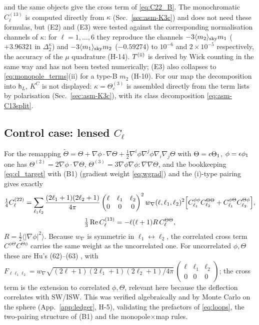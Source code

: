and the same objects give the cross term of \eqref{eq:C22_B}.  The monochromatic $C^{(13)}_\ell$ is computed directly from $\kappa$
(Sec.~\ref{sec:asm-K3c}) and does not need these formulas, but (E2) and (E3) were tested against the corresponding normalisation channels of $\kappa$:
for $\ell=1,\dots,6$ they reproduce the channels $-3\langle m_2\rangle_{\rm sky}m_1$ ($+3.96321$ in $\Delta^\kappa_2$) and $-3\langle m_1\rangle_{\rm sky}m_2$ ($-0.59274$) to $10^{-6}$ and $2\times10^{-5}$
respectively, the accuracy of the $\mu$ quadrature (H-14).  $T^{\rm(ii)}$ is derived by Wick counting in the same way and has not been tested
numerically; (E3) also collapses to \eqref{eq:monopole_terms}(ii) for a type-B $m_2$ (H-10).  For our map the decomposition into $\mathsf h_L$, $K^C$ is not
displayed: $\kappa=\Theta^{(3)}_c$ is assembled directly from the term lists by polarisation (Sec.~\ref{sec:asm-K3c}), with its class decomposition
\eqref{eq:asm-C13split}.

\subsection{Control case: lensed \texorpdfstring{$C_\ell$}{Cl}}
\label{sec:lensing_control}
For the remapping $\tilde\Theta=\Theta+\nabla\phi\cdot\nabla\Theta+\tfrac12\nabla^i\phi\nabla^j\phi\nabla_i\nabla_j\Theta$ with
$\Theta=\epsilon\Theta_1$, $\phi=\epsilon\phi_1$ one has $\Theta^{(2)}=2\nabla\phi\cdot\nabla\Theta$, $\Theta^{(3)}=3\nabla\phi\nabla\phi\!:\!\nabla\nabla\Theta$,
and the bookkeeping \eqref{eq:cl_target} with (B1) (gradient weight \eqref{eq:wgrad}) and the (i)-type pairing gives exactly
\begin{equation}
\begin{gathered}\tfrac14C^{(22)}_\ell=\sum_{\ell_1\ell_2}\frac{(2\ell_1+1)(2\ell_2+1)}{4\pi}\begin{pmatrix}\ell&\ell_1&\ell_2\\0&0&0\end{pmatrix}^2w_\nabla(\ell,\ell_1,\ell_2)^2\Big[C^{\phi\phi}_{\ell_1}C^{\Theta\Theta}_{\ell_2}+C^{\phi\Theta}_{\ell_1}C^{\Theta\phi}_{\ell_2}\Big],\\
\tfrac13\operatorname{Re} C^{(13)}_\ell=-\ell(\ell+1)R\,C^{\Theta\Theta}_\ell,\end{gathered}
\end{equation}
$R=\tfrac12\langle|\nabla\phi|^2\rangle$.  Because $w_\nabla$ is symmetric in $\ell_1\leftrightarrow\ell_2$, the correlated cross term
$C^{\phi\Theta}C^{\Theta\phi}$ carries the same weight as the uncorrelated one.  For uncorrelated $\phi,\Theta$ these are Hu's (62)--(63)
\cite{Hu2000,LewisChallinor}, with $F_{\ell\ell_1\ell_2}=w_\nabla\sqrt{(2\ell+1)(2\ell_1+1)(2\ell_2+1)/4\pi}\,(\begin{smallmatrix}\ell&\ell_1&\ell_2\\0&0&0\end{smallmatrix})$;
the cross term is the extension to correlated $\phi,\Theta$, relevant here because the deflection correlates with SW/ISW.  This was
verified algebraically and by Monte Carlo on the sphere (App.~\ref{app:ledger}, H-5), validating the prefactors of \eqref{eq:loops},
the two-pairing structure of (B1) and the monopole$\times$map rules.

